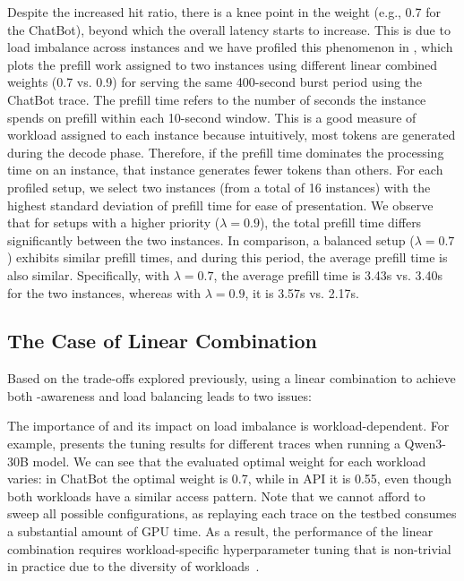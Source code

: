 Despite the increased {\kvcache} hit ratio, there is a knee point in the weight (e.g., 0.7 for the ChatBot),
beyond which the overall latency starts to increase. 
This is due to load imbalance across instances and we have profiled this phenomenon in 
{}, which plots the prefill
work assigned to two instances
using different linear combined weights (0.7 vs. 0.9) for serving the same 400-second burst period using the ChatBot trace.
The prefill time refers to the number of seconds the instance spends on prefill within each 10-second window.
This is a good measure of workload assigned to each instance because intuitively,
most tokens are generated during the decode phase. Therefore, if the prefill time dominates the processing time
on an instance, that instance generates fewer tokens than others.
For each profiled setup, we select two instances (from a total of 16 instances)
with the highest standard deviation of prefill time for ease of presentation.
We observe that for setups with a higher {\kvcache} priority ($\lambda=0.9$),
the total prefill time differs significantly between the two instances.
In comparison, a balanced setup ($\lambda=0.7$) exhibits similar prefill times,
and during this period, the average prefill time is also similar.
Specifically, with $\lambda=0.7$, the average prefill time is 3.43s vs. 3.40s
for the two instances, whereas with $\lambda=0.9$, it is 3.57s vs. 2.17s.




\subsection{The Case of Linear Combination}
\label{sec:linear-combination}

\noindent
Based on the trade-offs explored previously, 
using a linear combination to achieve both {\kvcache}-awareness and load balancing leads to two issues:

The importance of {\kvcache} and its impact on load imbalance is workload-dependent.
For example, {} presents the tuning results for different traces when running a Qwen3-30B model.
We can see that the evaluated optimal weight for each workload varies:
in ChatBot the optimal weight is 0.7, while in API it is 0.55,
even though both workloads have a similar {\kvcache} access pattern.
Note that we cannot afford to sweep all possible configurations,
as replaying each trace on the testbed consumes a substantial amount of GPU time.
As a result, the performance of the linear combination requires workload-specific hyperparameter tuning that 
is non-trivial in practice due to the diversity of workloads~\cite{10.5555/3768039.3768067}.


